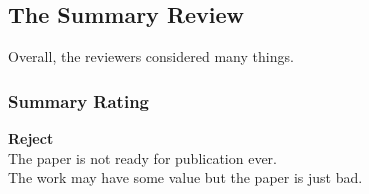 \subsection{The Summary Review}
Overall, the reviewers considered many things.

\subsubsection*{Summary Rating}
\textbf{Reject} \\
The paper is not ready for publication ever. \\
The work may have some value but the paper is just bad.

